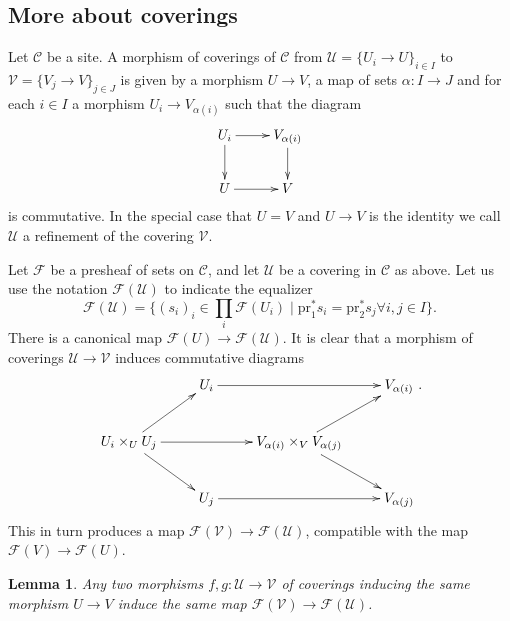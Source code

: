 \documentclass{amsart}
\newtheorem{lemma}[theorem]{Lemma}
\theoremstyle{definition}
\theoremstyle{remark}
\numberwithin{equation}{subsection}
\begin{document}
\subsection{More about coverings}
\label{subsection-coverings}

\noindent
Let $\mathcal{C}$ be a site. A morphism of coverings of $\mathcal{C}$ from 
$\mathcal{U}=\{U_i \to U\}_{i\in I}$ to $\mathcal{V}=\{V_j \to V\}_{j\in J}$
is given by a morphism $U \to V$, a map of sets $\alpha : I \to J$ and
for each $i\in I$ a morphism $U_i \to V_{\alpha(i)}$ such that
the diagram
$$
\xymatrix{
U_i \ar[r] \ar[d] & V_{\alpha(i)} \ar[d] \\
U \ar[r] & V
}
$$
is commutative. In the special case that $U=V$ and $U\to V$ is the identity
we call $\mathcal{U}$ a refinement of the covering $\mathcal{V}$.

\smallskip\noindent
Let $\mathcal{F}$ be a presheaf of sets on $\mathcal{C}$, and let
$\mathcal{U}$ be a covering in $\mathcal{C}$ as above. Let us use the
notation $\mathcal{F}(\mathcal{U})$ to indicate the equalizer
$$
\mathcal{F}(\mathcal{U}) = \{ (s_i)_i \in \prod_i \mathcal{F}(U_i)
\mid  \text{pr}_1^\ast s_i = \text{pr}_2^\ast s_j \forall i,j \in I\}.
$$
There is a canonical map $\mathcal{F}(U) \to \mathcal{F}(\mathcal{U})$.
It is clear that a morphism of coverings $\mathcal{U} \to \mathcal{V}$
induces commutative diagrams
$$
\xymatrix{
& U_i \ar[rr] & & V_{\alpha(i)} \\
U_i \times_U U_j \ar[rr] \ar[ur] \ar[dr] & & 
V_{\alpha(i)}\times_V V_{\alpha(j)} \ar[ur] \ar[dr] & \\
& U_j \ar[rr] & & V_{\alpha(j)}
}.
$$
This in turn produces a map $\mathcal{F}(\mathcal{V}) \to 
\mathcal{F}(\mathcal{U})$, compatible with the map $\mathcal{F}(V) 
\to \mathcal{F}(U)$. 

\begin{lemma}
\label{lemma-indepent-refinement}
Any two morphisms $f,g: \mathcal{U} \to \mathcal{V}$ of coverings
inducing the same morphism $U \to V$ induce the same
map $\mathcal{F}(\mathcal{V}) \to \mathcal{F}(\mathcal{U})$.
\end{lemma}
\end{document}
